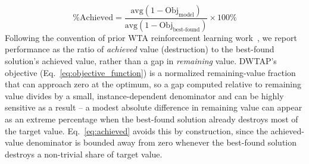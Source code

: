 \begin{equation}\label{eq:achieved}
\text{\% Achieved} = \frac{\text{avg}(1 - \text{Obj}_{\text{model}})}{\text{avg}(1 - \text{Obj}_{\text{best-found}})} \times 100\%
\end{equation}
Following the convention of prior WTA reinforcement learning work~\cite{gaudet2023}, we report performance as the ratio of \emph{achieved} value (destruction) to the best-found solution's achieved value, rather than a gap in \emph{remaining} value. DWTAP's objective (Eq.~\eqref{eq:objective_function}) is a normalized remaining-value fraction that can approach zero at the optimum, so a gap computed relative to remaining value divides by a small, instance-dependent denominator and can be highly sensitive as a result -- a modest absolute difference in remaining value can appear as an extreme percentage when the best-found solution already destroys most of the target value. Eq.~\eqref{eq:achieved} avoids this by construction, since the achieved-value denominator is bounded away from zero whenever the best-found solution destroys a non-trivial share of target value.

